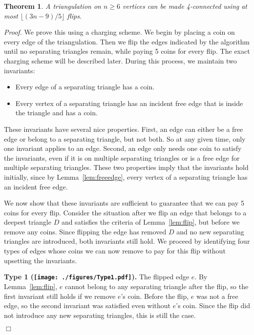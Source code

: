 \pdfoutput=1 \documentclass[12pt]{elsarticle}
\newtheorem{theo}[defin]{Theorem}
\newenvironment{theorem}{\begin{theo} \sl}{\end{theo}}
\newenvironment{proof}{\emph{Proof.}}{\hfill $\Box$ \medskip\\}
\begin{document}
\begin{theorem}
 \label{thm:4-connected}
 A triangulation on $n \geq 6$ vertices can be made 4-connected using at most $\lfloor(3n - 9)/5\rfloor$ flips.
\end{theorem}
\begin{proof}
 We prove this using a charging scheme. We begin by placing a coin on every edge of the triangulation. Then we flip the edges indicated by the algorithm until no separating triangles remain, while paying 5 coins for every flip. The exact charging scheme will be described later. During this process, we maintain two invariants:
 \begin{itemize}
  \item Every edge of a separating triangle has a coin.
  \item Every vertex of a separating triangle has an incident free edge that is inside the triangle and has a coin.
 \end{itemize}

 These invariants have several nice properties. First, an edge can either be a free edge or belong to a separating triangle, but not both. So at any given time, only one invariant applies to an edge. Second, an edge only needs one coin to satisfy the invariants, even if it is on multiple separating triangles or is a free edge for multiple separating triangles. These two properties imply that the invariants hold initially, since by Lemma~\ref{lem:freeedge}, every vertex of a separating triangle has an incident free edge.
 
We now show that these invariants are sufficient to guarantee that we can pay 5 coins for every flip. Consider the situation after we flip an edge that belongs to a deepest triangle $D$ and satisfies the criteria of Lemma~\ref{lem:flip}, but before we remove any coins. Since flipping the edge has removed $D$ and no new separating triangles are introduced, both invariants still hold. We proceed by identifying four types of edges whose coins we can now remove to pay for this flip without upsetting the invariants.
 
  \smallskip
  \textbf{Type 1 (\texttt{[image: ./figures/Type1.pdf]}).} The flipped edge $e$. By Lemma~\ref{lem:flip}, $e$ cannot belong to any separating triangle after the flip, so the first invariant still holds if we remove $e$'s coin. Before the flip, $e$ was not a free edge, so the second invariant was satisfied even without $e$'s coin. Since the flip did not introduce any new separating triangles, this is still the case.


\end{proof}
\end{document}
